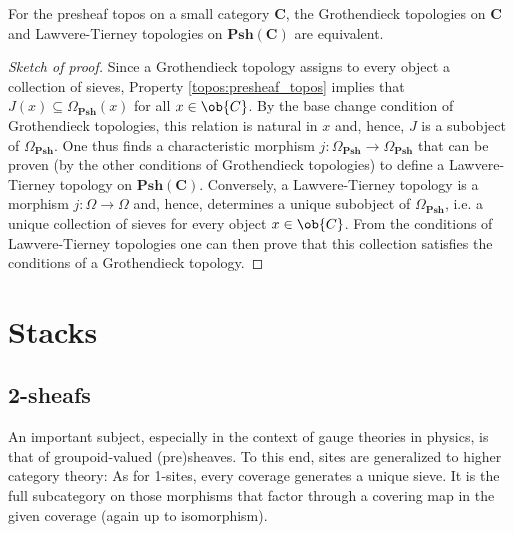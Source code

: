 
    \begin{property}
        For the presheaf topos on a small category $\mathbf{C}$, the Grothendieck topologies on $\mathbf{C}$ and Lawvere-Tierney topologies on $\mathbf{Psh(C)}$ are equivalent.
        \begin{proof}[Sketch of proof]
            Since a Grothendieck topology assigns to every object a collection of sieves, Property \ref{topos:presheaf_topos} implies that $J(x)\subseteq\Omega_\mathbf{Psh}(x)$ for all $x\in\ob{C}$. By the base change condition of Grothendieck topologies, this relation is natural in $x$ and, hence, $J$ is a subobject of $\Omega_\mathbf{Psh}$. One thus finds a characteristic morphism $j:\Omega_\mathbf{Psh}\rightarrow\Omega_\mathbf{Psh}$ that can be proven (by the other conditions of Grothendieck topologies) to define a Lawvere-Tierney topology on $\mathbf{Psh(C)}$. Conversely, a Lawvere-Tierney topology is a morphism $j:\Omega\rightarrow\Omega$ and, hence, determines a unique subobject of $\Omega_\mathbf{Psh}$, i.e. a unique collection of sieves for every object $x\in\ob{C}$. From the conditions of Lawvere-Tierney topologies one can then prove that this collection satisfies the conditions of a Grothendieck topology.
        \end{proof}
    \end{property}

\section{Stacks}
\subsection{2-sheafs}

    An important subject, especially in the context of gauge theories in physics, is that of groupoid-valued (pre)sheaves. To this end, sites are generalized to higher category theory:
    As for 1-sites, every coverage generates a unique sieve. It is the full subcategory on those morphisms that factor through a covering map in the given coverage (again up to isomorphism).

